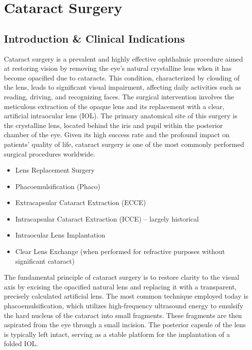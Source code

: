 \chapter{Cataract Surgery}

\section*{Introduction \& Clinical Indications}
Cataract surgery is a prevalent and highly effective ophthalmic procedure aimed at restoring vision by removing the eye's natural crystalline lens when it has become opacified due to cataracts. This condition, characterized by clouding of the lens, leads to significant visual impairment, affecting daily activities such as reading, driving, and recognizing faces. The surgical intervention involves the meticulous extraction of the opaque lens and its replacement with a clear, artificial intraocular lens (IOL). The primary anatomical site of this surgery is the crystalline lens, located behind the iris and pupil within the posterior chamber of the eye. Given its high success rate and the profound impact on patients' quality of life, cataract surgery is one of the most commonly performed surgical procedures worldwide.

\begin{itemize}
  \item Lens Replacement Surgery
  \item Phacoemulsification (Phaco)
  \item Extracapsular Cataract Extraction (ECCE)
  \item Intracapsular Cataract Extraction (ICCE) -- largely historical
  \item Intraocular Lens Implantation
  \item Clear Lens Exchange (when performed for refractive purposes without significant cataract)
\end{itemize}

The fundamental principle of cataract surgery is to restore clarity to the visual axis by excising the opacified natural lens and replacing it with a transparent, precisely calculated artificial lens. The most common technique employed today is phacoemulsification, which utilizes high-frequency ultrasound energy to emulsify the hard nucleus of the cataract into small fragments. These fragments are then aspirated from the eye through a small incision. The posterior capsule of the lens is typically left intact, serving as a stable platform for the implantation of a folded IOL.

